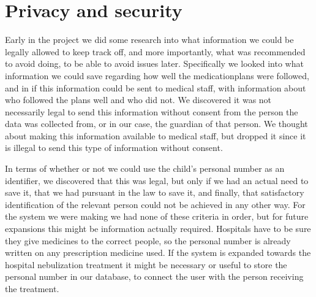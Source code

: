 \section{Privacy and security}
Early in the project we did some research into what information we could be legally allowed to keep track off, and 
more importantly, what was recommended to avoid doing, to be able to avoid issues later. Specifically we looked into
what information we could save regarding how well the medicationplans were followed, and in if this information could
be sent to medical staff, with information about who followed the plans well and who did not. We discovered it was not
necessarily legal to send this information without consent from the person the data was collected from, or in our case, 
the guardian of that person. We thought about making this information 
available to medical staff, but dropped it since it is illegal to send
this type of information without consent.

In terms of whether or not we could use the child's personal number as an identifier, we discovered that this was legal, but only 
if we had an actual need to save it, that we had pursuant in the law to save it, and finally, that satisfactory identification 
of the relevant person could not be achieved in any other way. For the system we were making we had none of these 
criteria in order, but for future expansions this might be information actually required. Hospitals have to be sure they 
give medicines to the correct people, so the personal number is already written on any prescription medicine used. If the 
system is expanded towards the hospital nebulization treatment it might be necessary or useful to store the personal number
in our database, to connect the user with the person receiving the treatment.